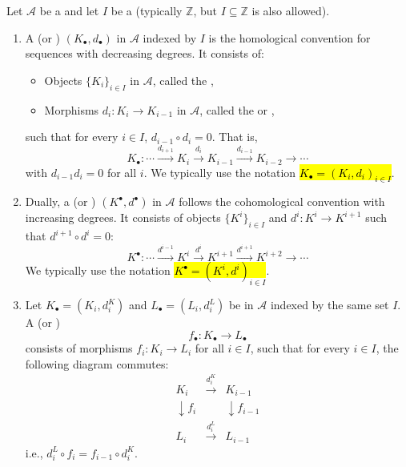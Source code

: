 \begin{definition} \label{definition:chain_complex_of_objects_in_a_preadditive_category}
Let $\mathcal{A}$ be a  and let $I$ be a  (typically $\mathbb{Z}$, but $I \subseteq \mathbb{Z}$ is also allowed). 
\begin{enumerate}
    \item A  (or ) $(K_\bullet, d_\bullet)$ in $\mathcal{A}$ indexed by $I$ is the homological convention for sequences with decreasing degrees. It consists of:
    \begin{itemize}
        \item Objects $\{ K_i \}_{i \in I}$ in $\mathcal{A}$, called the ,
        \item Morphisms $d_i: K_i \to K_{i-1}$ in $\mathcal{A}$, called the  or ,
    \end{itemize}
    such that for every $i \in I$, $d_{i-1} \circ d_i = 0$. That is,
    $$ K_\bullet: \cdots \xrightarrow{d_{i+1}} K_i \xrightarrow{d_i} K_{i-1} \xrightarrow{d_{i-1}} K_{i-2} \xrightarrow{} \cdots $$
    with $d_{i-1}d_i = 0$ for all $i$. We typically use the notation \hl{$K_\bullet = (K_i, d_i)_{i \in I}$}.



    \item Dually, a  (or ) $(K^\bullet, d^\bullet)$ in $\mathcal{A}$ follows the cohomological convention with increasing degrees. It consists of objects $\{ K^i \}_{i \in I}$ and  $d^i: K^i \to K^{i+1}$ such that $d^{i+1} \circ d^i = 0$:
    $$ K^\bullet: \cdots \xrightarrow{d^{i-1}} K^i \xrightarrow{d^i} K^{i+1} \xrightarrow{d^{i+1}} K^{i+2} \xrightarrow{} \cdots $$
    We typically use the notation \hl{$K^\bullet = (K^i, d^i)_{i \in I}$}.

    \item Let $K_\bullet = (K_i, d_i^K)$ and $L_\bullet = (L_i, d_i^L)$ be  in $\mathcal{A}$ indexed by the same set $I$. A  (or )
    $$ f_\bullet: K_\bullet \to L_\bullet $$
    consists of morphisms $f_i: K_i \to L_i$ for all $i \in I$, such that for every $i \in I$, the following diagram commutes:
    $$ \begin{array}{ccc} K_i & \xrightarrow{d_i^K} & K_{i-1} \\ \downarrow{f_i} && \downarrow{f_{i-1}} \\ L_i & \xrightarrow{d_i^L} & L_{i-1} \end{array} $$
    i.e., $d_i^L \circ f_i = f_{i-1} \circ d_i^K$. 




\end{enumerate}
\end{definition}
